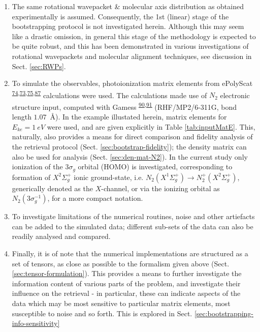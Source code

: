 \documentclass[10pt]{article}
\begin{document}
\begin{enumerate}
\item The same rotational wavepacket \& molecular axis distribution as obtained experimentally is assumed. Consequently, the 1st (linear) stage of the bootstrapping protocol is not investigated herein. Although this may seem like a drastic omission, in general this stage of the methodology is expected to be quite robust, and this has been demonstrated in various investigations of rotational wavepackets and molecular alignment techniques, see discussion in Sect. \ref{sec:RWPs}.
\item To simulate the observables, photoionization matrix elements from ePolyScat \textsuperscript{\hyperref[csl:74]{74},\hyperref[csl:73]{73},\hyperref[csl:75]{75},\hyperref[csl:87]{87}} calculations were used. The calculations made use of $N_2$ electronic structure input, computed with Gamess \textsuperscript{\hyperref[csl:90]{90},\hyperref[csl:91]{91}} (RHF/MP2/6-311G, bond length $1.07$~\AA). In the example illustated herein, matrix elements for $E_{ke}=1~eV$ were used, and are given explicitly in Table \ref{tab:inputMatE}. This, naturally, also provides a means for direct comparison and fidelity analysis of the retrieval protocol (Sect. \ref{sec:bootstrap-fidelity}); the density matrix can also be used for analysis (Sect. \ref{sec:den-mat-N2}). In the current study only ionization of the $3\sigma_g$ orbital (HOMO) is investigated, corresponding to formation of  $X^2\Sigma_{g}^{+}$ ionic ground-state, i.e. $N_2(X^{1}\Sigma^{+}_{g}) \rightarrow N^+_2(X^{2}\Sigma^{+}_{g})$, generically denoted as the $X$-channel, or via the ionizing orbital as $N_2(3\sigma_g^{-1})$, for a more compact notation. 
\item To investigate limitations of the numerical routines, noise and other artiefacts can be added to the simulated data; different sub-sets of the data can also be readily analysed and compared.
\item Finally, it is of note that the numerical implementations are structured as a set of tensors, as close as possible to the formalism given above (Sect. \ref{sec:tensor-formulation}). This provides a means to further investigate the information content of various parts of the problem, and investigate their influence on the retrieval - in particular, these can indicate aspects of the data which may be most sensitive to particular matrix elements, most susceptible to noise and so forth. This is explored in Sect. \ref{sec:bootstrapping-info-sensitivity}
\end{enumerate}
\end{document}
